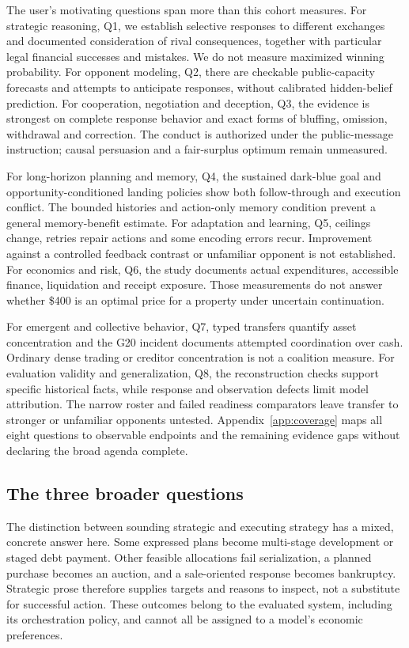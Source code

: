 The user's motivating questions span more than this cohort measures. For strategic reasoning, Q1, we establish selective responses to different exchanges and documented consideration of rival consequences, together with particular legal financial successes and mistakes. We do not measure maximized winning probability. For opponent modeling, Q2, there are checkable public-capacity forecasts and attempts to anticipate responses, without calibrated hidden-belief prediction. For cooperation, negotiation and deception, Q3, the evidence is strongest on complete response behavior and exact forms of bluffing, omission, withdrawal and correction. The conduct is authorized under the public-message instruction; causal persuasion and a fair-surplus optimum remain unmeasured.

For long-horizon planning and memory, Q4, the sustained dark-blue goal and opportunity-conditioned landing policies show both follow-through and execution conflict. The bounded histories and action-only memory condition prevent a general memory-benefit estimate. For adaptation and learning, Q5, ceilings change, retries repair actions and some encoding errors recur. Improvement against a controlled feedback contrast or unfamiliar opponent is not established. For economics and risk, Q6, the study documents actual expenditures, accessible finance, liquidation and receipt exposure. Those measurements do not answer whether \$400 is an optimal price for a property under uncertain continuation.

For emergent and collective behavior, Q7, typed transfers quantify asset concentration and the G20 incident documents attempted coordination over cash. Ordinary dense trading or creditor concentration is not a coalition measure. For evaluation validity and generalization, Q8, the reconstruction checks support specific historical facts, while response and observation defects limit model attribution. The narrow roster and failed readiness comparators leave transfer to stronger or unfamiliar opponents untested. Appendix~\ref{app:coverage} maps all eight questions to observable endpoints and the remaining evidence gaps without declaring the broad agenda complete.

\subsection{The three broader questions}

The distinction between sounding strategic and executing strategy has a mixed, concrete answer here. Some expressed plans become multi-stage development or staged debt payment. Other feasible allocations fail serialization, a planned purchase becomes an auction, and a sale-oriented response becomes bankruptcy. Strategic prose therefore supplies targets and reasons to inspect, not a substitute for successful action. These outcomes belong to the evaluated system, including its orchestration policy, and cannot all be assigned to a model's economic preferences.

